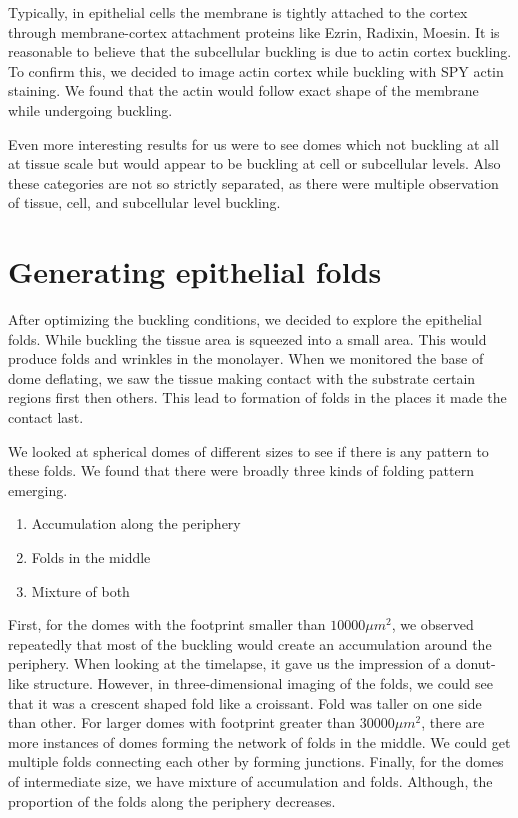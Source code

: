 Typically, in epithelial cells the membrane is tightly attached to the
cortex through membrane-cortex attachment proteins like Ezrin, Radixin,
Moesin. It is reasonable to believe that the subcellular buckling is due
to actin cortex buckling. To confirm this, we decided to image actin
cortex while buckling with SPY actin staining. We found that the actin
would follow exact shape of the membrane while undergoing buckling.

Even more interesting results for us were to see domes which not
buckling at all at tissue scale but would appear to be buckling at cell
or subcellular levels. Also these categories are not so strictly
separated, as there were multiple observation of tissue, cell, and
subcellular level buckling.

\hypertarget{generating-epithelial-folds}{%
\section{Generating epithelial
folds}\label{generating-epithelial-folds}}

After optimizing the buckling conditions, we decided to explore the
epithelial folds. While buckling the tissue area is squeezed into a
small area. This would produce folds and wrinkles in the monolayer. When
we monitored the base of dome deflating, we saw the tissue making
contact with the substrate certain regions first then others. This lead
to formation of folds in the places it made the contact last.

We looked at spherical domes of different sizes to see if there is any
pattern to these folds. We found that there were broadly three kinds of
folding pattern emerging.

\begin{enumerate}
\def\labelenumi{\arabic{enumi}.}

\item
  Accumulation along the periphery
\item
  Folds in the middle
\item
  Mixture of both
\end{enumerate}

First, for the domes with the footprint smaller than \(10000 \mu m^2\),
we observed repeatedly that most of the buckling would create an
accumulation around the periphery. When looking at the timelapse, it
gave us the impression of a donut-like structure. However, in
three-dimensional imaging of the folds, we could see that it was a
crescent shaped fold like a croissant. Fold was taller on one side than
other. For larger domes with footprint greater than \(30000\mu m^2\),
there are more instances of domes forming the network of folds in the
middle. We could get multiple folds connecting each other by forming
junctions. Finally, for the domes of intermediate size, we have mixture
of accumulation and folds. Although, the proportion of the folds along
the periphery decreases.

